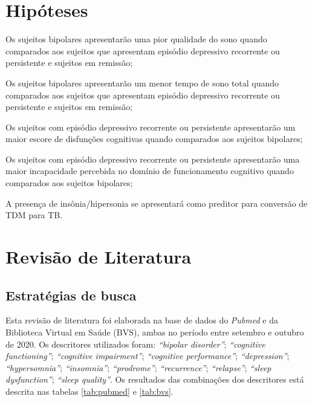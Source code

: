 \documentclass[chapter=TITLE,oneside,12pt,a4paper,english,brazil]{abntex2} %
\begin{document}
\chapter{Hipóteses}\label{sec:hipoteses}

    \begin{alineas}

        \item Os sujeitos bipolares apresentarão uma pior qualidade do sono
        quando comparados aos sujeitos que apresentam episódio depressivo
        recorrente ou persistente e sujeitos em remissão;
        \item Os sujeitos bipolares apresentarão um menor tempo de sono total
        quando comparados aos sujeitos que apresentam episódio depressivo
        recorrente ou persistente e sujeitos em remissão;
        \item Os sujeitos com episódio depressivo recorrente ou persistente
        apresentarão um maior escore de disfunções cognitivas quando comparados
        aos sujeitos bipolares;
        \item Os sujeitos com episódio depressivo recorrente ou persistente
        apresentarão uma maior incapacidade percebida no domínio de
        funcionamento cognitivo quando comparados aos sujeitos bipolares;
        \item A presença de insônia/hipersonia se apresentará como preditor
        para conversão de TDM para TB.

    \end{alineas}

\vspace{\onelineskip}
\chapter{Revisão de Literatura}\label{sec:revisao}

    \section{Estratégias de busca}\label{sec:estrategias}

    Esta revisão de literatura foi elaborada na base de dados do \textit{Pubmed}
    e da Biblioteca Virtual em Saúde (BVS), ambas no período entre setembro e
    outubro de 2020.
    Os descritores utilizados foram: \textit{``bipolar disorder''};
    \textit{``cognitive functioning''}; \textit{``cognitive impairment''};
    \textit{``cognitive performance''}; \textit{``depression''};
    \textit{``hypersomnia''}; \textit{``insomnia''}; \textit{``prodrome''};
    \textit{``recurrence''}; \textit{``relapse''}; \textit{``sleep dysfunction''};
    \textit{``sleep quality''}.
    Os resultados das combinações dos descritores está descrita nas tabelas
    \ref{tab:pubmed} e \ref{tab:bvs}.
    
\end{document}
